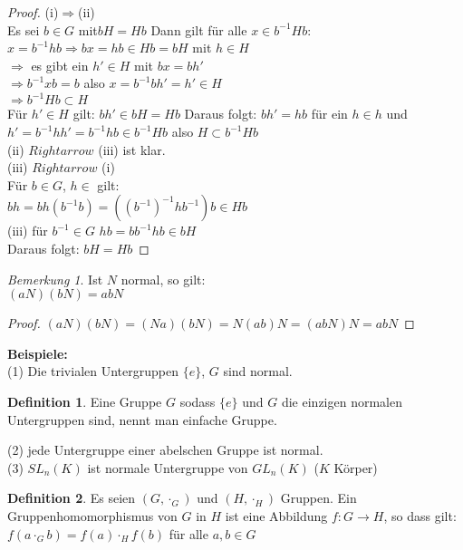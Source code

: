 \documentclass[12pt]{scrartcl}%
\theoremstyle{definition}
\newtheorem*{defn}{Definition}
\theoremstyle{remark}
\newtheorem*{nb}{Bemerkung}
\begin{document}
\begin{proof}
(i)$\Rightarrow$(ii)\\
Es sei $b \in G$ mit$bH=Hb$
Dann gilt für alle $x \in b^{-1}Hb$:\\
$x=b^{-1}hb \Rightarrow bx=hb \in Hb=bH$ mit $h \in H$\\
$\Rightarrow$ es gibt ein $h' \in H$ mit $bx=bh'$\\
$\Rightarrow b^{-1}xb=b$ also $x=b^{-1}bh'=h'\in H$\\
$\Rightarrow b^{-1}Hb \subset H$\\
Für $h' \in H$ gilt: $bh' \in bH = Hb$ Daraus folgt: $bh'=hb$ für ein $h \in h$ und
$h'=b^{-1}hh'=b^{-1}hb \in b^{-1}Hb$ also $H \subset b^{-1}Hb$\\
(ii) $Rightarrow$ (iii) ist klar.\\
(iii) $Rightarrow$ (i)\\
Für $b \in G$, $h\in $ gilt:\\
$bh=bh(b^{-1}b)=((b^{-1})^{-1}hb^{-1})b \in Hb$\\
(iii) für $b^{-1} \in G$ $hb=bb^{-1}hb \in bH$\\
Daraus folgt: $bH=Hb$
\end{proof}

\begin{nb}
Ist $N$ normal, so gilt:\\
$(aN)(bN)=abN$
\end{nb}

\begin{proof}
$(aN)(bN)=(Na)(bN)=N(ab)N=(abN)N=abN$
\end{proof}

\textbf{Beispiele:}\\
(1) Die trivialen Untergruppen $\{e\}$, $G$ sind normal.\\
\begin{defn}
Eine Gruppe $G$ sodass $\{e\}$ und $G$ die einzigen normalen Untergruppen sind, nennt man einfache Gruppe.
\end{defn}
(2) jede Untergruppe einer abelschen Gruppe ist normal.\\
(3) $SL_n(K)$ ist normale Untergruppe von $GL_n(K)$ ($K$ Körper)

\begin{defn}
Es seien $(G,\cdot_G)$ und $(H,\cdot_H)$ Gruppen. Ein Gruppenhomomorphismus von $G$ in $H$ ist eine Abbildung 
$f:G\rightarrow H$, so dass gilt:\\
$f(a\cdot_{G}b)=f(a)\cdot_{H}f(b)$ für alle $a,b\in G$ 
\end{defn}
\end{document}
